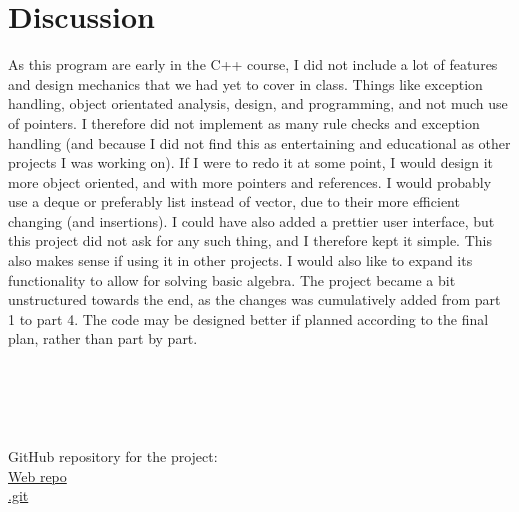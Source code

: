 \documentclass{article}
\begin{document}
	
	\section{Discussion}
		As this program are early in the C++ course, I did not include a lot of features and design mechanics that we had yet to cover in class. Things like exception handling, object orientated analysis, design, and programming, and not much use of pointers.
		I therefore did not implement as many rule checks and exception handling (and because I did not find this as entertaining and educational as other projects I was working on). If I were to redo it at some point, I would design it more object oriented, and with more pointers and references. I would probably use a deque or preferably list instead of vector, due to their more efficient changing (and insertions).
		I could have also added a prettier user interface, but this project did not ask for any such thing, and I therefore kept it simple. This also makes sense if using it in other projects. I would also like to expand its functionality to allow for solving basic algebra.
		The project became a bit unstructured towards the end, as the changes was cumulatively added from part 1 to part 4. The code may be designed better if planned according to the final plan, rather than part by part.
	\\ \\ \\ \\ \\ \\
	GitHub repository for the project: \\
	\href{https://github.com/catsymptote/cppCalculatorAssignment}{Web repo} \\
	\href{https://github.com/catsymptote/cppCalculatorAssignment.git}{.git}
	
	
	\clearpage
	
	
	
\end{document}
